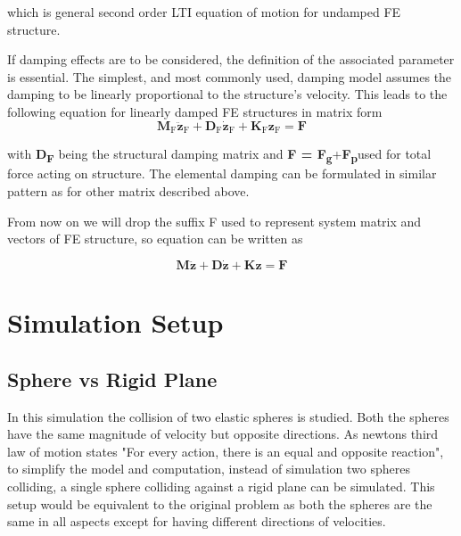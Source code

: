 which is general second order LTI equation of motion for undamped
FE structure.

If damping effects are to be considered, the definition of the associated
parameter is essential. The simplest, and most commonly used, damping
model assumes the damping to be linearly proportional to the structure\textquoteright s
velocity. This leads to the following equation for linearly damped
FE structures in matrix form 
\begin{equation}
\mathrm{\mathbf{M}_{F}\ddot{\boldsymbol{z}}_{F}+\mathbf{D}_{F}\mathbf{\dot{z}}_{F}+\mathbf{K}_{F}\mathbf{z}_{F}=\mathbf{F}}
\end{equation}


with \textbf{D\textsubscript{\textbf{F}}} being the structural damping
matrix and \textbf{F = F\textsubscript{\textbf{g}}}+\textbf{F\textsubscript{\textbf{p}}}used
for total force acting on structure. The elemental damping can be
formulated in similar pattern as for other matrix described above.

From now on we will drop the suffix F used to represent system matrix
and vectors of FE structure, so equation can be written as 

\begin{equation}
\mathbf{M}\ddot{\mathbf{\boldsymbol{z}}}+\mathbf{D}\mathbf{\dot{z}}+\mathbf{K}\mathbf{z}=\mathbf{F}\label{final equtation of motion FE}
\end{equation}





\section{Simulation Setup}
\subsection{Sphere vs Rigid Plane}
In this simulation the collision of two elastic spheres is studied. Both the spheres have the same magnitude of velocity but opposite directions. As newtons third law of motion states "For every action, there is an equal and opposite reaction", to simplify the model and computation, instead of simulation two spheres colliding, a single sphere colliding against a rigid plane can be simulated. This setup would be equivalent to the original problem as both the spheres are the same in all aspects except for having different directions of velocities.

